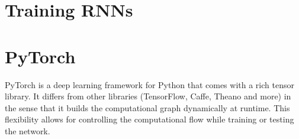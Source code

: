 	\section{Training RNNs}
		
	\section{PyTorch}
		PyTorch is a deep learning framework for Python that comes with a rich tensor library.
		It differs from other libraries (TensorFlow, Caffe, Theano and more) in the sense that it builds the computational graph dynamically at runtime.
		This flexibility allows for controlling the computational flow while training or testing the network.